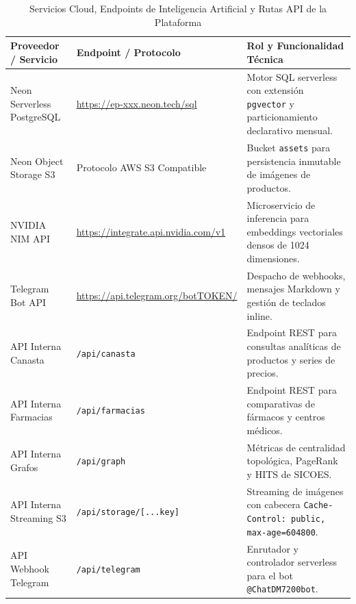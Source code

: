 \begin{table}[htbp]
    \centering
    \small
    \caption{Servicios Cloud, Endpoints de Inteligencia Artificial y Rutas API de la Plataforma}
    \label{tab:enlaces_cloud}
    \begin{tabularx}{\linewidth}{>{\raggedright\arraybackslash}p{4.5cm} >{\raggedright\arraybackslash}p{5.2cm} L}
        \toprule
        \textbf{Proveedor / Servicio} & \textbf{Endpoint / Protocolo} & \textbf{Rol y Funcionalidad Técnica} \\
        \midrule
        Neon Serverless PostgreSQL & \url{https://ep-xxx.neon.tech/sql} & Motor SQL serverless con extensión \nolinkurl{pgvector} y particionamiento declarativo mensual. \\
        Neon Object Storage S3 & Protocolo AWS S3 Compatible & Bucket \nolinkurl{assets} para persistencia inmutable de imágenes de productos. \\
        NVIDIA NIM API & \url{https://integrate.api.nvidia.com/v1} & Microservicio de inferencia para embeddings vectoriales densos de 1024 dimensiones. \\
        Telegram Bot API & \url{https://api.telegram.org/botTOKEN/} & Despacho de webhooks, mensajes Markdown y gestión de teclados inline. \\
        API Interna Canasta & \nolinkurl{/api/canasta} & Endpoint REST para consultas analíticas de productos y series de precios. \\
        API Interna Farmacias & \nolinkurl{/api/farmacias} & Endpoint REST para comparativas de fármacos y centros médicos. \\
        API Interna Grafos & \nolinkurl{/api/graph} & Métricas de centralidad topológica, PageRank y HITS de SICOES. \\
        API Interna Streaming S3 & \texttt{/api/storage/[...key]} & Streaming de imágenes con cabecera \texttt{Cache-Control: public, max-age=604800}. \\
        API Webhook Telegram & \texttt{/api/telegram} & Enrutador y controlador serverless para el bot \texttt{@ChatDM7200bot}. \\
        \bottomrule
    \end{tabularx}
\end{table}

